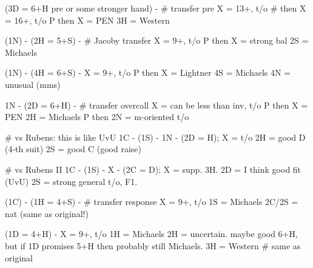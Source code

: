 (3D = 6+H pre or some stronger hand) -  # transfer pre
X = 13+, t/o  # then X = 16+, t/o
P then X = PEN
3H = Western

(1N) - (2H = 5+S) -  # Jacoby transfer
X = 9+, t/o
P then X = strong bal
2S = Michaels

(1N) - (4H = 6+S) - 
X = 9+, t/o
P then X = Lightner
4S = Michaels
4N = unusual (mms)

1N - (2D = 6+H) -  # transfer overcall
X = can be less than inv, t/o
P then X = PEN
2H = Michaels
P then 2N = m-oriented t/o

# vs Rubens: this is like UvU
1C - (1S) - 1N - (2D = H); 
X = t/o
2H = good D (4-th suit)
2S = good C (good raise)

# vs Rubens II
1C - (1S) - X - (2C = D); 
X = supp. 3H.
2D = I think good fit (UvU)
2S = strong general t/o, F1.

(1C) - (1H = 4+S) -  # transfer response
X = 9+, t/o
1S = Michaels
2C/2S = nat (same as original!)

(1D = 4+H) - 
X = 9+, t/o
1H = Michaels
2H = uncertain. maybe good 6+H, but if 1D promises 5+H then probably still Michaels.
3H = Western  # same as original